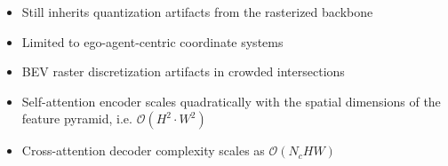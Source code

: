 \begin{itemize}[leftmargin=*, label=\redominus]
  \item Still inherits quantization artifacts from the rasterized backbone
  \item Limited to ego-agent-centric coordinate systems
  \item BEV raster discretization artifacts in crowded intersections
  \item Self-attention encoder scales quadratically with the spatial dimensions of the feature pyramid, i.e. \(\mathcal{O}(H^2 \cdot W^2)\)
  \item Cross-attention decoder complexity scales as \(\mathcal{O}(N_c H W)\)
\end{itemize}




\newpage